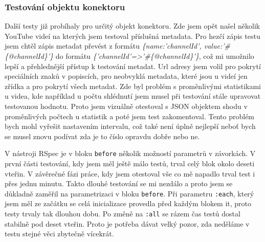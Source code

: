 \subsubsection{Testování objektu konektoru}
\par Další testy již probíhaly pro určitý objekt konektoru. Zde jsem opět našel několik YouTube videí na kterých jsem testoval příslušná metadata. Pro hezčí zápis testu jsem chtěl zápis metadat převést z formátu \textit{\{name:'channelId', value:'\#\{@channelId\}'\}} do formátu \textit{\{'channelId'=>'\#\{@channelId\}'\}}, což mi umožnilo lepší a přehlednější přístup k testování metadat. Url adresy jsem volil pro pokrytí speciálních znaků v popiscích, pro neobvyklá metadata, které jsou u videí jen zřídka a pro pokrytí všech metadat. Zde byl problém s proměnlivými statistikami u videa, kde například u počtu shlédnutí jsem musel při testování stále upravovat testovanou hodnotu. Proto jsem vizuálně otestoval s JSON objektem shodu v proměnlivých počtech u statistik a poté jsem test zakomentoval. Tento problém bych mohl vyřešit nastavením intervalu, což také není úplně nejlepší neboť bych se musel znovu podívat zda je to číslo opravdu dobře nebo ne.
\par V nástroji RSpec je v bloku \texttt{before} několik možností parametrů v závorkách. V první části testování, kdy jsem měl ještě málo testů, trval celý blok okolo deseti vteřin. V závěrečné fázi práce, kdy jsem otestoval vše co mě napadlo trval test i přes jednu minutu. Takto dlouhé testování se mi nezdálo a proto jsem se důkladně zaměřil na parametrizaci v bloku \texttt{before}. Při parametru \texttt{:each}, který jsem měl ze začátku se celá inicializace provedla před každým blokem it, proto testy trvaly tak dlouhou dobu. Po změně na \texttt{:all} se rázem čas testů dostal stabilně pod deset vteřin. Proto je potřeba dávat velký pozor, zda neděláme v testu stejné věci zbytečně vícekrát.
